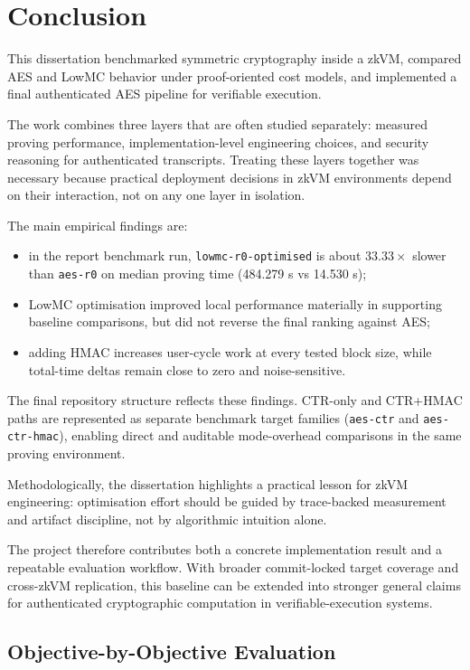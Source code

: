 \chapter{Conclusion}

This dissertation benchmarked symmetric cryptography inside a zkVM, compared AES
and LowMC behavior under proof-oriented cost models, and implemented a final
authenticated AES pipeline for verifiable execution.

The work combines three layers that are often studied separately: measured
proving performance, implementation-level engineering choices, and security
reasoning for authenticated transcripts. Treating these layers together was
necessary because practical deployment decisions in zkVM environments depend on
their interaction, not on any one layer in isolation.

The main empirical findings are:

\begin{itemize}
\item in the report benchmark run,
\texttt{lowmc-r0-optimised} is about \(33.33\times\) slower than
\texttt{aes-r0} on median proving time (484.279 s vs 14.530 s);
\item LowMC optimisation improved local performance materially in supporting
baseline comparisons, but did not reverse the final ranking against AES;
\item adding HMAC increases user-cycle work at every tested block size, while
total-time deltas remain close to zero and noise-sensitive.
\end{itemize}

The final repository structure reflects these findings. CTR-only and CTR+HMAC
paths are represented as separate benchmark target families
(\texttt{aes-ctr} and \texttt{aes-ctr-hmac}), enabling direct and auditable
mode-overhead comparisons in the same proving environment.

Methodologically, the dissertation highlights a practical lesson for zkVM
engineering: optimisation effort should be guided by trace-backed measurement and
artifact discipline, not by algorithmic intuition alone.

The project therefore contributes both a concrete implementation result and a
repeatable evaluation workflow. With broader commit-locked target coverage and
cross-zkVM replication, this baseline can be extended into stronger general
claims for authenticated cryptographic computation in verifiable-execution
systems.

\section{Objective-by-Objective Evaluation}

